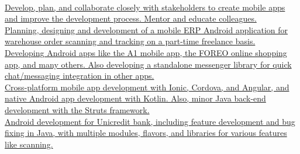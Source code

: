 \documentclass[theme]{cv_style}
\begin{document}
\begin{paracol}{2}
\begin{rightcolumn}
            \vspace{\itemspace}\\
            \href{https://www.azikus.com}{
            {Develop, plan, and collaborate closely with stakeholders to create mobile apps and improve the development process. Mentor and educate colleagues.}}
            \vspace{\itemspace}\\
            \href{https://opendynamic.de/}{
            {Planning, designing and development of a mobile ERP Android application for warehouse order scanning and tracking on a part-time freelance basis.}}
            \vspace{\itemspace}\\
            \href{https://undabot.com/}{
            {Developing Android apps like the A1 mobile app, the FOREO online shopping app, and many others. Also developing a standalone messenger library for quick chat/messaging integration in other apps.}}
            \vspace{\itemspace}\\
            \href{https://www.combis.hr/}{
            {Cross-platform mobile app development with Ionic, Cordova, and Angular, and native Android app development with Kotlin. Also, minor Java back-end development with the Struts framework.}}
            \vspace{\itemspace}\\
            \href{https://see.asseco.com/}{
            {Android development for Unicredit bank, including feature development and bug fixing in Java, with multiple modules, flavors, and libraries for various features like scanning.}}
            \vspace{0.1cm}\\
\end{rightcolumn}
\end{paracol}
\end{document}
